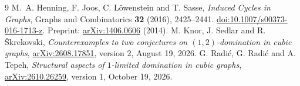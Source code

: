 \documentclass[11pt]{article}
\begin{document}
\begin{thebibliography}{9}
M.~A. Henning, F. Joos, C. L\"owenstein and T. Sasse,
\emph{Induced Cycles in Graphs},
Graphs and Combinatorics \textbf{32} (2016), 2425--2441.
\href{https://doi.org/10.1007/s00373-016-1713-z}{doi:10.1007/s00373-016-1713-z}.
Preprint: \href{https://arxiv.org/abs/1406.0606}{arXiv:1406.0606} (2014).
M. Knor, J. Sedlar and R. \v{S}krekovski,
\emph{Counterexamples to two conjectures on $(1,2)$-domination
in cubic graphs},
\href{https://arxiv.org/abs/2608.17851}{arXiv:2608.17851},
version 2, August 19, 2026.
G. Radi\'c, G. Radi\'c and A. Tepeh,
\emph{Structural aspects of $1$-limited domination in cubic graphs},
\href{https://arxiv.org/abs/2610.26259}{arXiv:2610.26259},
version 1, October 19, 2026.
\end{thebibliography}
\end{document}
